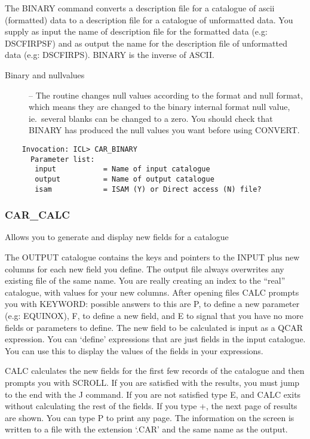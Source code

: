 The BINARY command converts a description file for a catalogue of ascii
(formatted) data to a description file for a catalogue of unformatted data.
You supply as input the name of description file
for the formatted data (e.g: DSCFIRPSF) and as output the name for
the description file of unformatted data (e.g: DSCFIRPS).
BINARY is the inverse of ASCII.

\begin{description}
\item [Binary and nullvalues] --
The routine changes null values according to the format and null format,
which means they are changed to the binary internal format null value,
ie.\ several blanks can be changed to a zero.
You should check that BINARY has produced the null values you want before using
CONVERT.
\end{description}

\begin{verbatim}
    Invocation: ICL> CAR_BINARY
      Parameter list:
       input           = Name of input catalogue
       output          = Name of output catalogue
       isam            = ISAM (Y) or Direct access (N) file?
\end{verbatim}

\subsubsection{CAR\_CALC}

Allows you to generate and display new fields for a catalogue

The OUTPUT catalogue contains the keys and pointers to the INPUT
plus new columns for each new field you define.
The output file always overwrites any existing file of the same name.
You are really creating an index to the ``real'' catalogue, with values for
your new columns.
After opening files CALC prompts you with KEYWORD:
possible answers to this are P, to define a new parameter (e.g: EQUINOX),
F, to define a new field, and E to signal that you have no more fields
or parameters to define.
The new field to be calculated is input as a QCAR expression.
You can `define' expressions that are just fields in the input catalogue.
You can use this to display the values of the fields in your expressions.

CALC calculates the new fields for the first few records
of the catalogue and then prompts you with SCROLL.
If you are satisfied with the results, you must jump to the end with the J
command.
If you are not satisfied type E, and CALC exits without calculating the
rest of the fields.
If you type +, the next page of results are shown.
You can type P to print any page.
The information on the screen is written to a file with the extension `.CAR'
and the same name as the output.

